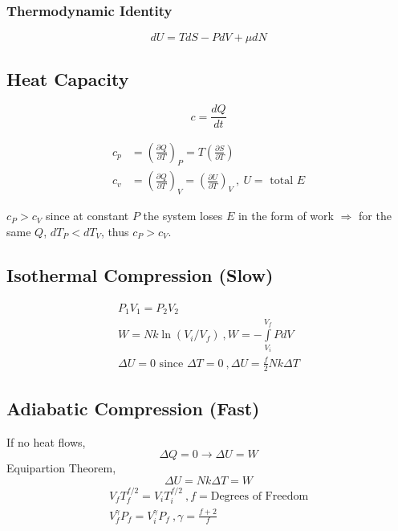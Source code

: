 \documentclass[10pt,a4paper]{article}
\begin{document}
\subsubsection{Thermodynamic Identity}
\begin{equation}
 dU = TdS - PdV + \mu dN 
\end{equation}

\subsection{Heat Capacity}
\begin{equation}
 c = \frac{dQ}{dt}
\end{equation}

\begin{align}
 c_p &= \left( \frac{\partial Q}{\partial T} \right)_P = T \left( \frac{\partial S}{\partial T} \right)\\
 c_v &= \left( \frac{\partial Q}{\partial T} \right)_V = \left( \frac{\partial U}{\partial T} \right)_V~,~U =\textrm{ total } E
\end{align}

$c_P > c_V$ since at constant $P$ the system loses $E$ in the form of work $\Rightarrow$ for the same $Q$, $dT_P < dT_V$, thus $c_P > c_V$.

\subsection{Isothermal Compression (Slow)}
\begin{align}
 P_1V_1 = P_2V_2\\
 W = Nk\ln(V_i/V_f) ~, W = -\int \limits_{V_i}^{V_f}PdV\\
 \Delta U =0 \textrm{ since } \Delta T = 0~, \Delta U = \frac{f}{2} Nk \Delta T
\end{align}

\subsection{Adiabatic Compression (Fast)}
If no heat flows,
\begin{equation}
    \Delta Q =0 \rightarrow \Delta U = W
\end{equation}
Equipartion Theorem, 
\begin{equation}
 \Delta U = Nk \Delta T = W 
\end{equation}
\begin{align}
 V_f T_f^{f/2}  = V_i T_i^{f/2}~, f = \textrm{Degrees of Freedom}\\
 V_f^\gamma P_f = V_i^\gamma P_f ~, \gamma = \frac{f + 2}{f}
\end{align}
\end{document}

